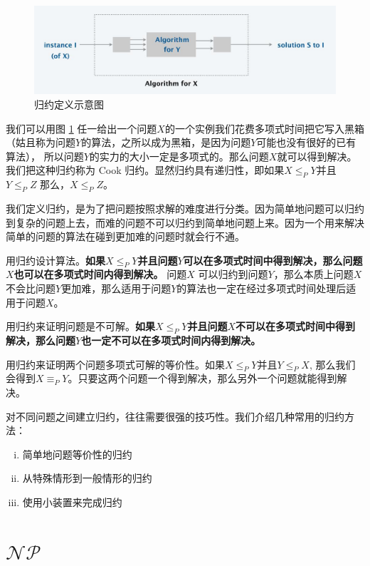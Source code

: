 \documentclass[]{article}
\begin{document}
\begin{figure}[htbp]
	\centering
	\includegraphics[width=1\linewidth]{picture/01}
	\caption{归约定义示意图}
	\label{fig:1}
\end{figure}
我们可以用图 \ref{fig:1} 任一给出一个问题$X$的一个实例我们花费多项式时间把它写入黑箱（姑且称为问题$Y$的算法，之所以成为黑箱，是因为问题$Y$可能也没有很好的已有算法），
所以问题$Y$的实力的大小一定是多项式的。那么问题$X$就可以得到解决。我们把这种归约称为 Cook 归约。显然归约具有递归性，即如果$ X \leq_P Y $并且$ Y \leq_P Z $ 那么，$ X \leq_P Z $。

我们定义归约，是为了把问题按照求解的难度进行分类。因为简单地问题可以归约到复杂的问题上去，而难的问题不可以归约到简单地问题上来。因为一个用来解决简单的问题的算法在碰到更加难的问题时就会行不通。

用归约设计算法。\textbf{如果$ X \leq_P Y $并且问题$Y$可以在多项式时间中得到解决，那么问题$X$也可以在多项式时间内得到解决。} 问题$X$ 可以归约到问题$Y$，那么本质上问题$X$不会比问题$Y$更加难，那么适用于问题$Y$的算法也一定在经过多项式时间处理后适用于问题$X$。

用归约来证明问题是不可解。\textbf{如果$ X \leq_P Y $并且问题$X$不可以在多项式时间中得到解决，那么问题$Y$也一定不可以在多项式时间内得到解决。}

用归约来证明两个问题多项式可解的等价性。如果$ X \leq_P Y $并且$ Y \leq_P X $, 那么我们会得到$ X \equiv_P Y $。只要这两个问题一个得到解决，那么另外一个问题就能得到解决。

对不同问题之间建立归约，往往需要很强的技巧性。我们介绍几种常用的归约方法：

\begin{enumerate}[i.]
	\item 简单地问题等价性的归约
	\item 从特殊情形到一般情形的归约
	\item 使用小装置来完成归约
\end{enumerate}

\section{$\mathcal{NP}$}
\end{document}
